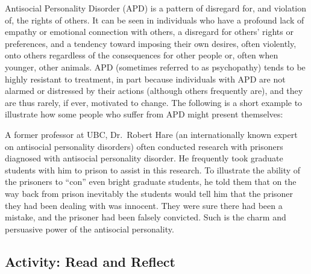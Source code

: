 \documentclass[
]{book}
\begin{document}
Antisocial Personality Disorder (APD) is a pattern of disregard for, and violation of, the rights of others. It can be seen in individuals who have a profound lack of empathy or emotional connection with others, a disregard for others' rights or preferences, and a tendency toward imposing their own desires, often violently, onto others regardless of the consequences for other people or, often when younger, other animals. APD (sometimes referred to as psychopathy) tends to be highly resistant to treatment, in part because individuals with APD are not alarmed or distressed by their actions (although others frequently are), and they are thus rarely, if ever, motivated to change. The following is a short example to illustrate how some people who suffer from APD might present themselves:

A former professor at UBC, Dr.~Robert Hare (an internationally known expert on antisocial personality disorders) often conducted research with prisoners diagnosed with antisocial personality disorder. He frequently took graduate students with him to prison to assist in this research. To illustrate the ability of the prisoners to ``con'' even bright graduate students, he told them that on the way back from prison inevitably the students would tell him that the prisoner they had been dealing with was innocent. They were sure there had been a mistake, and the prisoner had been falsely convicted. Such is the charm and persuasive power of the antisocial personality.

\hypertarget{activity-read-and-reflect-18}{%
\subsection*{Activity: Read and Reflect}\label{activity-read-and-reflect-18}}
\end{document}
